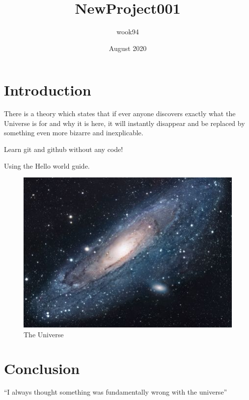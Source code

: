 \documentclass{article}
\title{NewProject001}
\author{wook94 }
\date{August 2020}
\begin{document}
\maketitle

\section{Introduction}
There is a theory which states that if ever anyone discovers exactly what the Universe is for and why it is here, it will instantly disappear and be replaced by something even more bizarre and inexplicable.

Learn git and github without any code!

Using the Hello world guide.

\begin{figure}[h!]
\centering
\includegraphics[scale=1.6]{universe}
\caption{The Universe}
\label{fig:universe}
\end{figure}

\section{Conclusion}
``I always thought something was fundamentally wrong with the universe'' \citep{adams1995hitchhiker}



\end{document}

